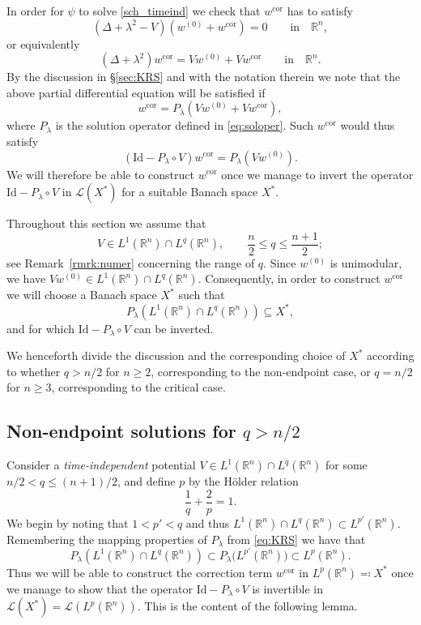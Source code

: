 \documentclass[11pt,a4paper]{amsart}
\theoremstyle{remark}
\theoremstyle{definition}
\newcommand{\R}{\mathbb{R}}
\begin{document}
In order for $\psi$ to solve \eqref{sch_timeind} we check that $w^{\mathrm{cor}}$ has to satisfy
\[
\left(\Delta+\lambda^2-V\right)(w^{(0)}+w^{\mathrm{cor}})=0\qquad\mathrm{in}\quad\R^n,
\]
or equivalently
\[
\left(\Delta+\lambda^2\right)w^{\mathrm{cor}}=Vw^{(0)}+Vw^{\mathrm{cor}}\qquad\mathrm{in}\quad\R^n.
\]
By the discussion in \S\ref{sec:KRS} and with the notation therein we note that the above partial differential equation will be satisfied if
\[
w^{\mathrm{cor}}=P_\lambda(Vw^{(0)}+Vw^{\mathrm{cor}}),
\]
where $P_\lambda$ is the solution operator defined in \eqref{eq:soloper}. Such $w^{\mathrm{cor}}$ would thus satisfy
\[
\left(\mathrm{Id}-P_\lambda \circ V\right)w^{\mathrm{cor}}
= P_\lambda(Vw^{(0)}).
\]
We will therefore be able to construct $w^{\mathrm{cor}}$ once we manage to invert the operator $\mathrm{Id}-P_\lambda\circ V$ in $\mathcal L(X^*)$ for a suitable Banach space $X^*$.

Throughout this section we assume that
\[
V\in L^1(\R^n)\cap L^q(\R^n),\qquad  \frac n2 \leq q\leq \frac {n+1}{2};
\]
see Remark~\ref{rmrk:numer} concerning the range of $q$. Since $w^{(0)}$ is unimodular, we have $Vw^{(0)}\in L^1(\R^n)\cap L^q(\R^n)$. Consequently, in order to construct $w^{\mathrm{cor}}$ we will choose a Banach space $X^*$ such that
\[
P_\lambda\left(L^1(\R^n)\cap L^q(\R^n)\right)\subseteq X^*,
\]
and for which $\mathrm{Id}-P_\lambda\circ V$ can be inverted.

We henceforth divide the discussion and the corresponding choice of $X^*$ according to whether $q>n/2$ for $n\geq 2$, corresponding to the non-endpoint case, or $q=n/2$ for $n\geq 3$, corresponding to the critical case.


\subsection{Non-endpoint solutions for \texorpdfstring{$q>n/2$}{q>n/2}} Consider a \emph{time-independent} potential $V\in L^1(\R^n)\cap L^q(\R^n)$ for some $n/2<q\leq (n+1)/2$, and define  $p$ by the H\"older relation
\[
\frac{1}{q}+\frac{2}{p}=1.
\]
We begin by noting that $1<p'<q$ and thus $L^1(\R^n)\cap L^q(\R^n)\subset L^{p'}(\R^n)$. Remembering the mapping properties of $P_\lambda$ from \eqref{eq:KRS} we have that 
\[
P_\lambda\left(L^1(\R^n)\cap L^q(\R^n)\right)\subset P_\lambda\big (L^{p'}(\R^n)\big)\subset L^p(\R^n).
\]
Thus we will be able to construct the correction term $w^{\mathrm{cor}}$ in $L^p(\R^n)\eqqcolon X^*$ once we manage to show that the operator $\mathrm{Id}-P_\lambda\circ V$ is invertible in $\mathcal L(X^*)=\mathcal L(L^p(\R^n))$. This is the content of the following lemma.
\end{document}
